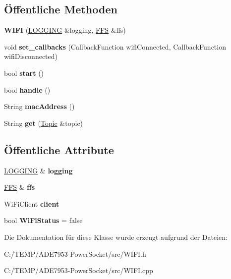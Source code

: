 \subsection*{Öffentliche Methoden}
\begin{DoxyCompactItemize}
\item 
\mbox{\label{class_w_i_f_i_afc734f0cace3978a3304c4b70a364f57}} 
{\bfseries W\+I\+FI} (\hyperlink{class_l_o_g_g_i_n_g}{L\+O\+G\+G\+I\+NG} \&logging, \hyperlink{class_f_f_s}{F\+FS} \&ffs)
\item 
\mbox{\label{class_w_i_f_i_a554751a46e587d8952e9792fb2b8d1f1}} 
void {\bfseries set\+\_\+callbacks} (Callback\+Function wifi\+Connected, Callback\+Function wifi\+Disconnected)
\item 
\mbox{\label{class_w_i_f_i_a890d05b9593104d9b9194e80e2229bdf}} 
bool {\bfseries start} ()
\item 
\mbox{\label{class_w_i_f_i_a5f31e525ef4009a1c375c51a57e6fddc}} 
bool {\bfseries handle} ()
\item 
\mbox{\label{class_w_i_f_i_a44bf4fdb6860bcc8c65559abfa779622}} 
String {\bfseries mac\+Address} ()
\item 
\mbox{\label{class_w_i_f_i_a601248aeebafdf3581a33356e52d30f8}} 
String {\bfseries get} (\hyperlink{class_topic}{Topic} \&topic)
\end{DoxyCompactItemize}
\subsection*{Öffentliche Attribute}
\begin{DoxyCompactItemize}
\item 
\mbox{\label{class_w_i_f_i_afd6bbf4f690b9758c300b3e4e0d1f294}} 
\hyperlink{class_l_o_g_g_i_n_g}{L\+O\+G\+G\+I\+NG} \& {\bfseries logging}
\item 
\mbox{\label{class_w_i_f_i_af1e3a48cc5f0bd3c3ab3245279b7cef3}} 
\hyperlink{class_f_f_s}{F\+FS} \& {\bfseries ffs}
\item 
\mbox{\label{class_w_i_f_i_a200fc29ce84c782a7eee94bf9b0d1660}} 
Wi\+Fi\+Client {\bfseries client}
\item 
\mbox{\label{class_w_i_f_i_ab619e6b80e554ca319808dfaf6eb82ba}} 
bool {\bfseries Wi\+Fi\+Status} = false
\end{DoxyCompactItemize}


Die Dokumentation für diese Klasse wurde erzeugt aufgrund der Dateien\+:\begin{DoxyCompactItemize}
\item 
C\+:/\+T\+E\+M\+P/\+A\+D\+E7953-\/\+Power\+Socket/src/W\+I\+F\+I.\+h\item 
C\+:/\+T\+E\+M\+P/\+A\+D\+E7953-\/\+Power\+Socket/src/W\+I\+F\+I.\+cpp\end{DoxyCompactItemize}
